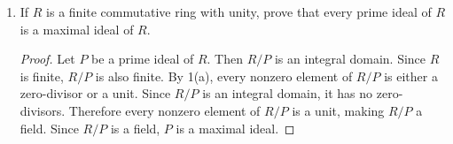 \documentclass[12pt, letterpaper]{article}
\newcommand{\Z}{\mathbb{Z}}
\begin{document}
\begin{enumerate}
\begin{enumerate}[(a)]
\begin{proof}
            $(\Leftarrow)$ Suppose $s$ is prime. Let $B$ be an ideal of $\Z_n$ such that $\langle s \rangle \subseteq B$
            and $B \neq \langle s \rangle$. We want to show $B = \Z_n$. Since $B \neq \langle s \rangle$, there exists
            $b \in B$ such that $b \notin \langle s \rangle$. In regards to $s$, this means $b$ is not a multiple of $s$,
            so $s \nmid b$. Since $s$ is prime and $s \nmid b$, that means the $\gcd(s, b) = 1$.  By B\'{e}zout's Identity, there exist integers $u, v$ such that $us + vb = 1$.
            Since $s \in \langle s \rangle \subseteq B$ and $b \in B$, and ideals are closed
            under multiplication and subtraction, which is the inverse of addition, so $us + vb$ must be in $B$. So, $B = \Z_n$. Thus, $\langle s \rangle$ is maximal.
        \end{proof}
    \end{enumerate}

    \item If $R$ is a finite commutative ring with unity, prove that every prime ideal of $R$ is a maximal ideal of $R$. %

    \begin{proof}
        Let $P$ be a prime ideal of $R$. Then $R/P$ is an integral domain. Since $R$ is finite,
        $R/P$ is also finite. By 1(a), every nonzero element of $R/P$ is either a zero-divisor
        or a unit. Since $R/P$ is an integral domain, it has no zero-divisors. Therefore every nonzero element
        of $R/P$ is a unit, making $R/P$ a field. Since $R/P$ is a field, $P$ is a maximal ideal.
    \end{proof}

\end{enumerate}
\end{document}
